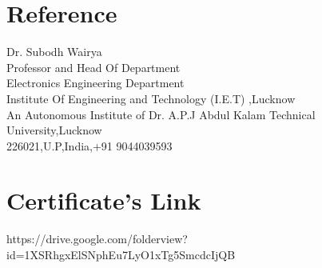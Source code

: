 \documentclass[11pt]{article}
\begin{document}
\section{Reference}
\begin{flushleft}
Dr. Subodh Wairya \\
Professor and Head Of Department \\
Electronics Engineering Department \\
Institute Of Engineering and Technology (I.E.T) ,Lucknow \\
An Autonomous Institute of Dr. A.P.J Abdul Kalam Technical University,Lucknow \\
226021,U.P,India,+91 9044039593
\end{flushleft}
\section{Certificate's Link}
https://drive.google.com/folderview?id=1XSRhgxElSNphEu7LyO1xTg5SmcdcIjQB
\end{document}
